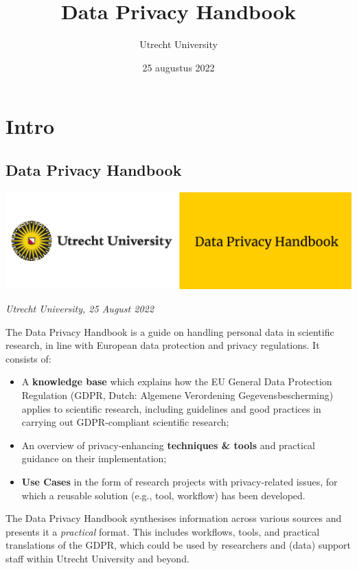 \documentclass[
]{book}
\title{Data Privacy Handbook}
\author{Utrecht University}
\date{25 augustus 2022}
\providecommand{\tightlist}{%
  \setlength{\itemsep}{0pt}\setlength{\parskip}{0pt}}
\begin{document}
\maketitle

{
\setcounter{tocdepth}{1}
\tableofcontents
}
\hypertarget{part-intro}{%
\part*{Intro}\label{part-intro}}

\hypertarget{data-privacy-handbook}{%
\chapter*{Data Privacy Handbook}\label{data-privacy-handbook}}

\includegraphics{img/cover-image-dph.png}

\emph{Utrecht University, 25 August 2022}

The Data Privacy Handbook is a guide on handling personal data in scientific
research, in line with European data protection and privacy regulations. It
consists of:

\begin{itemize}
\tightlist
\item
  A \textbf{knowledge base} which explains how the EU General Data Protection
  Regulation (GDPR, Dutch: Algemene Verordening Gegevensbescherming) applies to
  scientific research, including guidelines and good practices in carrying out
  GDPR-compliant scientific research;
\item
  An overview of privacy-enhancing \textbf{techniques \& tools} and practical guidance
  on their implementation;
\item
  \textbf{Use Cases} in the form of research projects with privacy-related issues,
  for which a reusable solution (e.g., tool, workflow) has been developed.
\end{itemize}

The Data Privacy Handbook synthesises information across various sources and
presents it a \emph{practical} format. This includes workflows, tools, and practical
translations of the GDPR, which could be used by researchers and (data) support
staff within Utrecht University and beyond.
\end{document}
